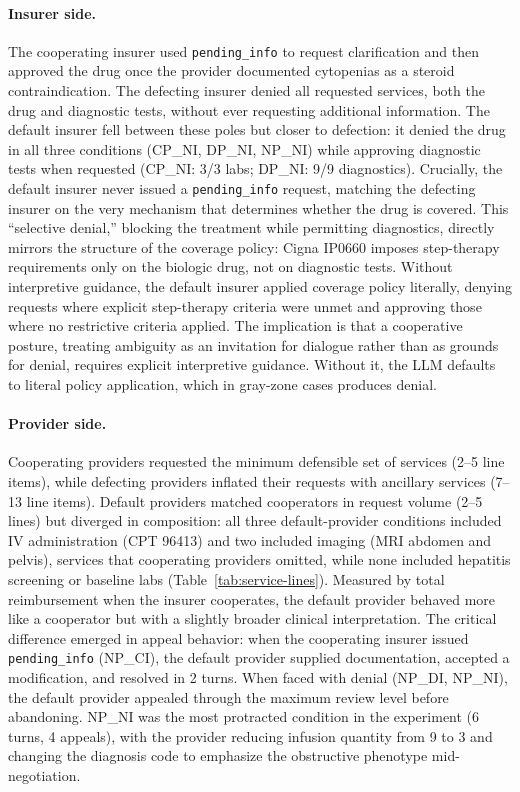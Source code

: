 \paragraph{Insurer side.}
The cooperating insurer used \texttt{pending\_info} to request clarification and then approved the drug once the provider documented cytopenias as a steroid contraindication. The defecting insurer denied all requested services, both the drug and diagnostic tests, without ever requesting additional information. The default insurer fell between these poles but closer to defection: it denied the drug in all three conditions (CP\_NI, DP\_NI, NP\_NI) while approving diagnostic tests when requested (CP\_NI: 3/3 labs; DP\_NI: 9/9 diagnostics). Crucially, the default insurer never issued a \texttt{pending\_info} request, matching the defecting insurer on the very mechanism that determines whether the drug is covered. This ``selective denial,'' blocking the treatment while permitting diagnostics, directly mirrors the structure of the coverage policy: Cigna IP0660 imposes step-therapy requirements only on the biologic drug, not on diagnostic tests. Without interpretive guidance, the default insurer applied coverage policy literally, denying requests where explicit step-therapy criteria were unmet and approving those where no restrictive criteria applied. The implication is that a cooperative posture, treating ambiguity as an invitation for dialogue rather than as grounds for denial, requires explicit interpretive guidance. Without it, the LLM defaults to literal policy application, which in gray-zone cases produces denial.

\paragraph{Provider side.}
Cooperating providers requested the minimum defensible set of services (2--5 line items), while defecting providers inflated their requests with ancillary services (7--13 line items). Default providers matched cooperators in request volume (2--5 lines) but diverged in composition: all three default-provider conditions included IV administration (CPT 96413) and two included imaging (MRI abdomen and pelvis), services that cooperating providers omitted, while none included hepatitis screening or baseline labs (Table~\ref{tab:service-lines}). Measured by total reimbursement when the insurer cooperates, the default provider behaved more like a cooperator but with a slightly broader clinical interpretation. The critical difference emerged in appeal behavior: when the cooperating insurer issued \texttt{pending\_info} (NP\_CI), the default provider supplied documentation, accepted a modification, and resolved in 2 turns. When faced with denial (NP\_DI, NP\_NI), the default provider appealed through the maximum review level before abandoning. NP\_NI was the most protracted condition in the experiment (6 turns, 4 appeals), with the provider reducing infusion quantity from 9 to 3 and changing the diagnosis code to emphasize the obstructive phenotype mid-negotiation.

